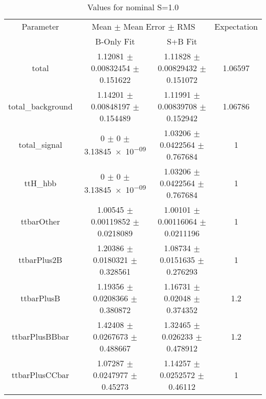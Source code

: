 \begin{table}
\centering
\caption{Values for nominal S=1.0}
\begin{tabular}{cccc}
\toprule
Parameter & \multicolumn{2}{c}{Mean $\pm$ Mean Error $\pm$ RMS} & Expectation\\
 & B-Only Fit & S+B Fit & \\
\midrule
total & \num{1.12081} $\pm$ \num{0.00832454} $\pm$ \num{0.151622} & \num{1.11828} $\pm$ \num{0.00829432} $\pm$ \num{0.151072} & \num{1.06597}\\
total\_background & \num{1.14201} $\pm$ \num{0.00848197} $\pm$ \num{0.154489} & \num{1.11991} $\pm$ \num{0.00839708} $\pm$ \num{0.152942} & \num{1.06786}\\
total\_signal & \num{0} $\pm$ \num{0} $\pm$ \num{3.13845e-09} & \num{1.03206} $\pm$ \num{0.0422564} $\pm$ \num{0.767684} & \num{1}\\
ttH\_hbb & \num{0} $\pm$ \num{0} $\pm$ \num{3.13845e-09} & \num{1.03206} $\pm$ \num{0.0422564} $\pm$ \num{0.767684} & \num{1}\\
ttbarOther & \num{1.00545} $\pm$ \num{0.00119852} $\pm$ \num{0.0218089} & \num{1.00101} $\pm$ \num{0.00116064} $\pm$ \num{0.0211196} & \num{1}\\
ttbarPlus2B & \num{1.20386} $\pm$ \num{0.0180321} $\pm$ \num{0.328561} & \num{1.08734} $\pm$ \num{0.0151635} $\pm$ \num{0.276293} & \num{1}\\
ttbarPlusB & \num{1.19356} $\pm$ \num{0.0208366} $\pm$ \num{0.380872} & \num{1.16731} $\pm$ \num{0.02048} $\pm$ \num{0.374352} & \num{1.2}\\
ttbarPlusBBbar & \num{1.42408} $\pm$ \num{0.0267673} $\pm$ \num{0.488667} & \num{1.32465} $\pm$ \num{0.026233} $\pm$ \num{0.478912} & \num{1.2}\\
ttbarPlusCCbar & \num{1.07287} $\pm$ \num{0.0247977} $\pm$ \num{0.45273} & \num{1.14257} $\pm$ \num{0.0252572} $\pm$ \num{0.46112} & \num{1}\\
\bottomrule
\end{tabular}
\end{table}